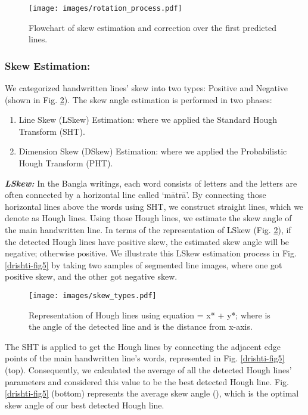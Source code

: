 \documentclass[runningheads]{llncs}
\begin{document}
\begin{figure}[h]
\centering
\texttt{[image: images/rotation\_process.pdf]}
\vspace{-2mm}
\caption{Flowchart of skew estimation and correction over the first predicted lines.}
\label{drishti-fig3}
\vspace{-6mm}
\end{figure}

\subsubsection{Skew Estimation:}

We categorized handwritten lines' skew into two types: Positive and Negative (shown in Fig. \ref{drishti-fig4}). The skew angle estimation is performed in two phases:
\begin{enumerate}
    \item Line Skew (LSkew) Estimation: where we applied the Standard Hough Transform (SHT).
    \item Dimension Skew (DSkew) Estimation: where we applied the Probabilistic Hough Transform (PHT).
\end{enumerate}

\noindent \textbf{\textit{LSkew:}} In the Bangla writings, each word consists of letters and the letters are often connected by a horizontal line called ‘mātrā’. By connecting those horizontal lines above the words using SHT, we construct straight lines, which we denote as Hough lines. Using those Hough lines, we estimate the skew angle of the main handwritten line. In terms of the representation of LSkew (Fig. \ref{drishti-fig4}), if the detected Hough lines have positive skew, the estimated skew angle will be negative; otherwise positive. We illustrate this LSkew estimation process in Fig. \ref{drishti-fig5} by taking two samples of segmented line images, where one got positive skew, and the other got negative skew. 

\begin{figure}
\centering
\texttt{[image: images/skew\_types.pdf]}
\vspace{-6mm}
\caption{Representation of Hough lines using equation  = x* + y*; where  is the angle of the detected line and  is the distance from x-axis.} 
\label{drishti-fig4}
\vspace{-4mm}
\end{figure} 

The SHT is applied to get the Hough lines by connecting the adjacent edge points of the main handwritten line’s words, represented in Fig. \ref{drishti-fig5} (top). Consequently, we calculated the average of all the detected Hough lines' parameters and considered this value to be the best detected Hough line. Fig. \ref{drishti-fig5} (bottom) represents the average skew angle (), which is the optimal skew angle of our best detected Hough line.
\end{document}

